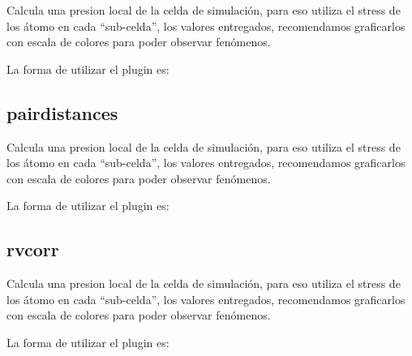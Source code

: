 Calcula una presion local de la celda de simulaci\'on, para eso utiliza el
stress de los \'atomo en cada ``sub-celda'', los valores entregados,
recomendamos graficarlos con escala de colores para poder observar fen\'omenos. 

La forma de utilizar el plugin es:

\subsection{pairdistances}

Calcula una presion local de la celda de simulaci\'on, para eso utiliza el
stress de los \'atomo en cada ``sub-celda'', los valores entregados,
recomendamos graficarlos con escala de colores para poder observar fen\'omenos. 

La forma de utilizar el plugin es:

\subsection{rvcorr}

Calcula una presion local de la celda de simulaci\'on, para eso utiliza el
stress de los \'atomo en cada ``sub-celda'', los valores entregados,
recomendamos graficarlos con escala de colores para poder observar fen\'omenos. 

La forma de utilizar el plugin es:


